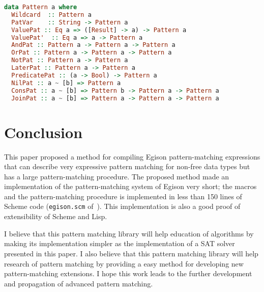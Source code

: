 \documentclass[acmlarge]{acmart}
\begin{document}
\begin{lstlisting}[language=haskell]
data Pattern a where
  Wildcard  :: Pattern a
  PatVar    :: String -> Pattern a
  ValuePat :: Eq a => ([Result] -> a) -> Pattern a
  ValuePat'  :: Eq a => a -> Pattern a
  AndPat :: Pattern a -> Pattern a -> Pattern a
  OrPat :: Pattern a -> Pattern a -> Pattern a
  NotPat :: Pattern a -> Pattern a
  LaterPat :: Pattern a -> Pattern a
  PredicatePat :: (a -> Bool) -> Pattern a
  NilPat :: a ~ [b] => Pattern a
  ConsPat :: a ~ [b] => Pattern b -> Pattern a -> Pattern a
  JoinPat :: a ~ [b] => Pattern a -> Pattern a -> Pattern a
\end{lstlisting}

\section{Conclusion}\label{conclusion}

This paper proposed a method for compiling Egison pattern-matching expressions that can describe very expressive pattern matching for non-free data types but has a large pattern-matching procedure.
The proposed method made an implementation of the pattern-matching system of Egison very short; the macros and the pattern-matching procedure is implemented in less than 150 lines of Scheme code (\texttt{egison.scm} of~\cite{egisonScheme}).
This implementation is also a good proof of extensibility of Scheme and Lisp.

I believe that this pattern matching library will help education of algorithms by making its implementation simpler as the implementation of a SAT solver presented in this paper.
I also believe that this pattern matching library will help research of pattern matching by providing a easy method for developing new pattern-matching extensions.
I hope this work leads to the further development and  propagation of advanced pattern matching.




\end{document}

